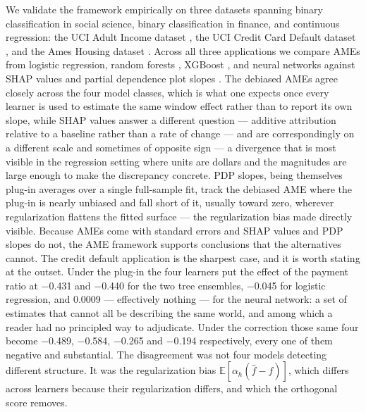 \documentclass[12pt]{article}
\newcommand{\E}{\mathbb{E}}
\begin{document}
	We validate the framework empirically on three datasets spanning binary classification
	in social science, binary classification in finance, and continuous regression: the
	UCI Adult Income dataset \citep{kohavi1996, UCI}, the UCI Credit Card Default dataset
	\citep{yeh2009, UCI}, and the Ames Housing dataset \citep{decock2011}. Across all
	three applications we compare AMEs from logistic regression, random forests
	\citep{breiman2001rf}, XGBoost \citep{chen2016xgboost}, and neural networks against
	SHAP values \citep{lundberg2017shap} and partial dependence plot slopes
	\citep{friedman2001pdp}. The debiased AMEs agree closely across the four model classes,
	which is what one expects once every learner is used to estimate the same window
	effect rather than to report its own slope, while SHAP values answer a different
	question --- additive attribution relative to a baseline rather than a rate of
	change --- and are correspondingly on a different scale and sometimes of opposite
	sign --- a divergence that is
	most visible in the regression setting where units are dollars and the magnitudes are
	large enough to make the discrepancy concrete. PDP slopes, being themselves plug-in
	averages over a single full-sample fit, track the debiased AME where the plug-in is
	nearly unbiased and fall short of it, usually toward zero, wherever regularization
	flattens the fitted surface --- the regularization bias made directly visible.
	Because AMEs come with standard errors and SHAP values and PDP slopes do not, the AME
	framework supports conclusions that the alternatives cannot. The credit default
	application is the sharpest case, and it is worth stating at the outset. Under the
	plug-in the four learners put the effect of the payment ratio at
	$-$0.431 and $-$0.440 for the two tree ensembles, $-$0.045 for logistic regression, and
	0.0009 --- effectively nothing --- for the neural network: a set of estimates that
	cannot all be describing the same world, and among which a reader had no principled way
	to adjudicate. Under the correction those same four become $-$0.489, $-$0.584,
	$-$0.265 and $-$0.194 respectively, every one of them negative and substantial. The
	disagreement was not four
	models detecting different structure. It was the regularization bias
	$\E[\alpha_h(\hat{f} - f)]$, which differs across learners because their regularization
	differs, and which the orthogonal score removes.
\end{document}
